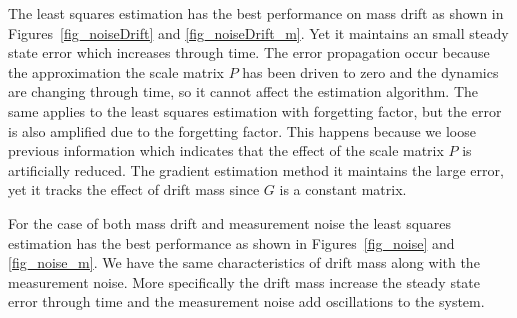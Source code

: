 \documentclass[12pt]{article}
\begin{document}
The least squares estimation has the best performance on mass drift as shown in Figures~\ref{fig_noiseDrift} and \ref{fig_noiseDrift_m}. Yet it maintains an small steady state error which increases through time. The error propagation occur because the approximation the scale matrix $P$ has been driven to zero and the dynamics are changing through time, so it cannot affect the estimation algorithm. The same applies to the least squares estimation with forgetting factor, but the error is also amplified due to the forgetting factor. This happens because we loose previous information which indicates that the effect of the scale matrix $P$ is artificially reduced. The gradient estimation method it maintains the large error, yet it tracks the effect of drift mass since $G$ is a constant matrix.

For the case of both mass drift and measurement noise the least squares estimation has the best performance as shown in Figures~\ref{fig_noise} and \ref{fig_noise_m}. We have the same characteristics of drift mass along with the measurement noise. More specifically the drift mass increase the steady state error through time and the measurement noise add oscillations to the system. 
\end{document}
